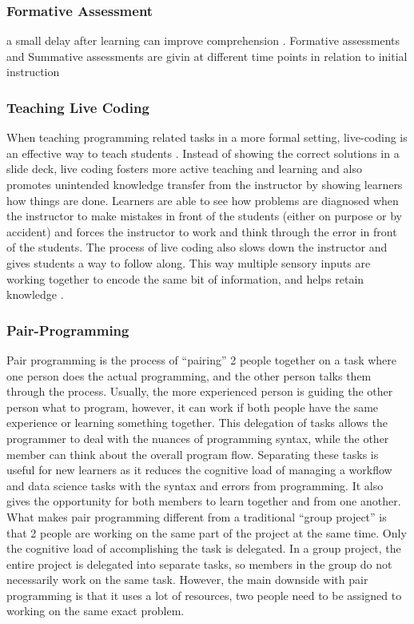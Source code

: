 \documentclass[010-intro.tex]{subfiles}
\begin{document}
        \subsubsection{Formative Assessment}


            a small delay after learning can improve comprehension
            \cite{andersonWhyDelayedSummaries2008,}.
            Formative assessments and Summative assessments are givin at different time points in relation to
            initial instruction



        \subsubsection{Teaching Live Coding}

        When teaching programming related tasks in a more formal setting, live-coding is an effective way to teach students . Instead of showing the correct solutions in a slide deck, live coding fosters more active teaching and learning and also promotes unintended knowledge transfer from the instructor by showing learners how things are done. Learners are able to see how problems are diagnosed when the instructor to make mistakes in front of the students (either on purpose or by accident) and forces the instructor to work and think through the error in front of the students. The process of live coding also slows down the instructor and gives students a way to follow along. This way multiple sensory inputs are working together to encode the same bit of information, and helps retain knowledge .

        \subsubsection{Pair-Programming}

        Pair programming is the process of “pairing” 2 people together on a task where one person does the actual programming, and the other person talks them through the process. Usually, the more experienced person is guiding the other person what to program, however, it can work if both people have the same experience or learning something together. This delegation of tasks allows the programmer to deal with the nuances of programming syntax, while the other member can think about the overall program flow. Separating these tasks is useful for new learners as it reduces the cognitive load of managing a workflow and data science tasks with the syntax and errors from programming. It also gives the opportunity for both members to learn together and from one another. What makes pair programming different from a traditional “group project” is that 2 people are working on the same part of the project at the same time. Only the cognitive load of accomplishing the task is delegated. In a group project, the entire project is delegated into separate tasks, so members in the group do not necessarily work on the same task. However, the main downside with pair programming is that it uses a lot of resources, two people need to be assigned to working on the same exact problem.
\end{document}
